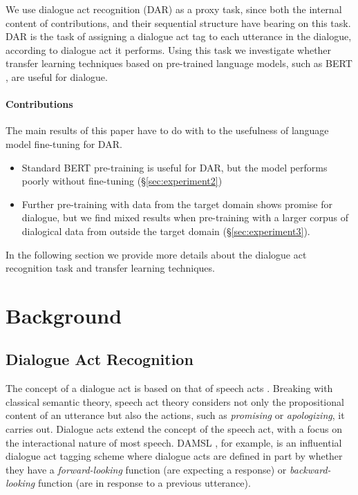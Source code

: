 \documentclass[11pt,a4paper]{article}
\begin{document}
We use dialogue act recognition (DAR) as a proxy task, since both the internal content of contributions, and their sequential structure have bearing on this task. DAR is the task of assigning a dialogue act tag to each utterance in the dialogue, according to dialogue act it performs.
Using this task we investigate whether transfer learning techniques based on pre-trained language models, such as BERT \citep{devlinBERTPretrainingDeep2018}, are useful for dialogue. 

\paragraph{Contributions}
The main results of this paper have to do with to the usefulness of language model fine-tuning for DAR.
\begin{itemize}
  \item Standard BERT pre-training is useful for DAR, but the model performs poorly without fine-tuning (\S\ref{sec:experiment2})
  \item Further pre-training with data from the target domain shows promise for dialogue, but we find mixed results when pre-training with a larger corpus of dialogical data from outside the target domain (\S\ref{sec:experiment3}).
  \end{itemize}

In the following section we provide more details about the dialogue act recognition task and transfer learning techniques. 

\section{Background}

\subsection{Dialogue Act Recognition}
The concept of a dialogue act is based on that of speech acts \citep{austinHowThingsWords2009}.
Breaking with classical semantic theory, speech act theory considers not only the propositional content of an utterance but also the actions, such as \emph{promising} or \emph{apologizing}, it carries out.
Dialogue acts extend the concept of the speech act, with a focus on the interactional nature of most speech.
DAMSL \citep{coreCodingDialogsDAMSL1997}, for example, is an influential dialogue act tagging scheme where dialogue acts are defined in part by whether they have a \emph{forward-looking} function (are expecting a response) or \emph{backward-looking} function (are in response to a previous utterance).
\end{document}
